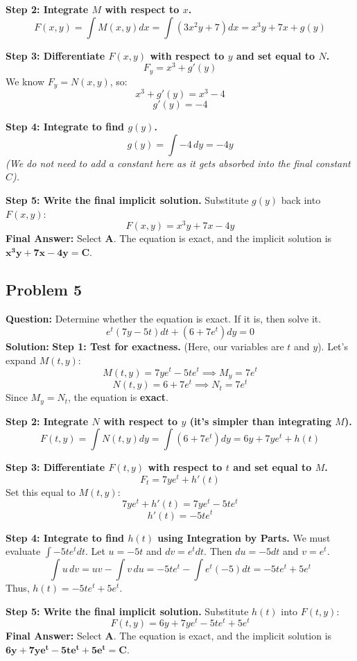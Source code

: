 \documentclass[11pt]{article}
\begin{document}
\textbf{Step 2: Integrate $M$ with respect to $x$.}
\[ F(x, y) = \int M(x, y) dx = \int \left(3x^2 y + 7\right) dx = x^3 y + 7x + g(y) \]

\textbf{Step 3: Differentiate $F(x,y)$ with respect to $y$ and set equal to $N$.}
\[ F_y = x^3 + g'(y) \]
We know $F_y = N(x,y)$, so:
\[ x^3 + g'(y) = x^3 - 4 \]
\[ g'(y) = -4 \]

\textbf{Step 4: Integrate to find $g(y)$.}
\[ g(y) = \int -4 \, dy = -4y \]
\textit{(We do not need to add a constant here as it gets absorbed into the final constant $C$).}

\textbf{Step 5: Write the final implicit solution.}
Substitute $g(y)$ back into $F(x,y)$:
\[ F(x, y) = x^3 y + 7x - 4y \]
\textbf{Final Answer:} Select \textbf{A}. The equation is exact, and the implicit solution is $\mathbf{x^3 y + 7x - 4y = C}$.

\vspace{0.5cm}
\subsection*{Problem 5}
\textbf{Question:} Determine whether the equation is exact. If it is, then solve it.
\[ e^t (7y - 5t) dt + \left(6 + 7e^t\right) dy = 0 \]
\textbf{Solution:} 
\textbf{Step 1: Test for exactness.} (Here, our variables are $t$ and $y$).
Let's expand $M(t,y)$:
\[ M(t,y) = 7y e^t - 5t e^t \implies M_y = 7e^t \]
\[ N(t,y) = 6 + 7e^t \implies N_t = 7e^t \]
Since $M_y = N_t$, the equation is \textbf{exact}.

\textbf{Step 2: Integrate $N$ with respect to $y$ (it's simpler than integrating $M$).}
\[ F(t,y) = \int N(t,y) dy = \int \left(6 + 7e^t\right) dy = 6y + 7y e^t + h(t) \]

\textbf{Step 3: Differentiate $F(t,y)$ with respect to $t$ and set equal to $M$.}
\[ F_t = 7y e^t + h'(t) \]
Set this equal to $M(t,y)$:
\[ 7y e^t + h'(t) = 7y e^t - 5t e^t \]
\[ h'(t) = -5t e^t \]

\textbf{Step 4: Integrate to find $h(t)$ using Integration by Parts.}
We must evaluate $\int -5t e^t dt$. Let $u = -5t$ and $dv = e^t dt$.
Then $du = -5 dt$ and $v = e^t$.
\[ \int u \, dv = uv - \int v \, du = -5t e^t - \int e^t (-5) dt = -5t e^t + 5e^t \]
Thus, $h(t) = -5t e^t + 5e^t$.

\textbf{Step 5: Write the final implicit solution.}
Substitute $h(t)$ into $F(t,y)$:
\[ F(t, y) = 6y + 7y e^t - 5t e^t + 5e^t \]
\textbf{Final Answer:} Select \textbf{A}. The equation is exact, and the implicit solution is $\mathbf{6y + 7ye^t - 5te^t + 5e^t = C}$.
\end{document}
